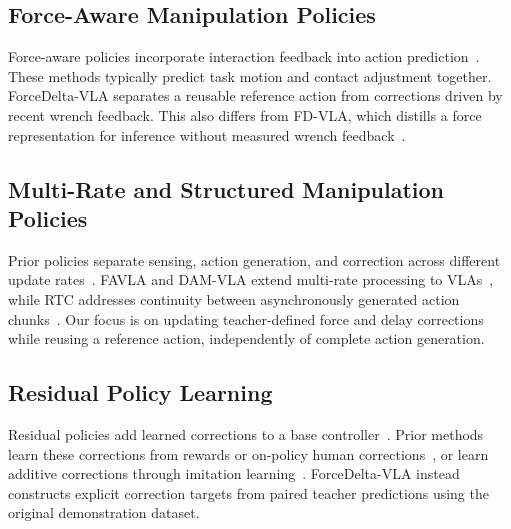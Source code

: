 \subsection{Force-Aware Manipulation Policies}
Force-aware policies incorporate interaction feedback into action prediction~\cite{yu2025forcevlaenhancingvlamodels,li2026forcevla2unleashinghybridforceposition,zhang2025tavlaelucidatingdesignspace,li2026fmvlaforcebasedmemoryvisionlanguageaction,zhang2026craftadaptingvlamodels,liu2025forcemimicforcecentricimitationlearning}. These methods typically predict task motion and contact adjustment together. ForceDelta-VLA separates a reusable reference action from corrections driven by recent wrench feedback. This also differs from FD-VLA, which distills a force representation for inference without measured wrench feedback~\cite{zhao2026fdvlaforcedistilledvisionlanguageactionmodel}.

\subsection{Multi-Rate and Structured Manipulation Policies}
Prior policies separate sensing, action generation, and correction across different update rates~\cite{lee2025manipforceforceguidedpolicylearning,chen2026implicitrdpendtoendvisualforcediffusion,wang2026phaforcephasescheduledvisualforcepolicy,fang2026forcepolicylearninghybrid,zhuo2026fardp}. FAVLA and DAM-VLA extend multi-rate processing to VLAs~\cite{li2026favlaforceadaptivefastslowvla,vanjani2026damvladecoupledasynchronousmultimodal}, while RTC addresses continuity between asynchronously generated action chunks~\cite{black2025realtimechunking}. Our focus is on updating teacher-defined force and delay corrections while reusing a reference action, independently of complete action generation.

\subsection{Residual Policy Learning}
Residual policies add learned corrections to a base controller~\cite{johannink2018residualreinforcementlearningrobot}. Prior methods learn these corrections from rewards or on-policy human corrections~\cite{ankile2024imitationrefinementresidual,xu2025compliantresidualdaggerimproving,yu2026omnitactunepolicyagnosticrealworldrl,wang2026lateforceacceleratingvla}, or learn additive corrections through imitation learning~\cite{wang2026phaforcephasescheduledvisualforcepolicy}. ForceDelta-VLA instead constructs explicit correction targets from paired teacher predictions using the original demonstration dataset.

